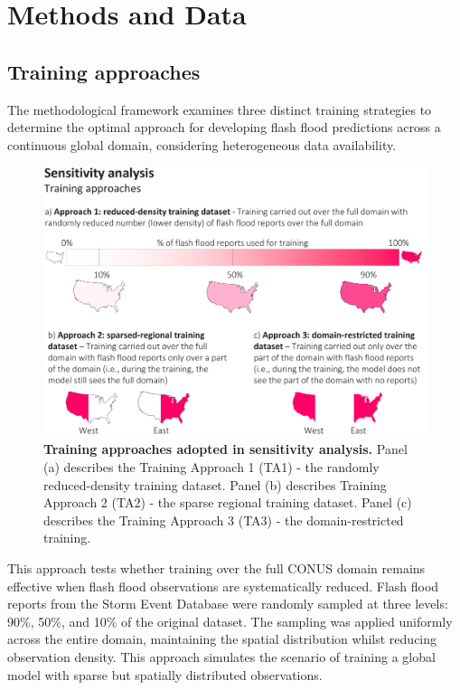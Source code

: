 

\section{Methods and Data}

\subsection{Training approaches}
The methodological framework examines three distinct training strategies to determine the optimal approach for developing flash flood predictions across a continuous global domain, considering heterogeneous data availability. 

\begin{figure}[htbp]
\centering
\includegraphics[width=\textwidth]{training_approaches.png}
\caption{\textbf{Training approaches adopted in sensitivity analysis.} Panel (a) describes the Training Approach 1 (TA1) - the randomly reduced-density training dataset. Panel (b) describes Training Approach 2 (TA2) - the sparse regional training dataset. Panel (c) describes the Training Approach 3 (TA3) - the domain-restricted training.}
\label{fig:training_approaches}
\end{figure}

This  approach tests whether training over the full CONUS domain remains effective when flash flood observations are systematically reduced. Flash flood reports from the Storm Event Database were randomly sampled at three levels: 90\%, 50\%, and 10\% of the original dataset. The sampling was applied uniformly across the entire domain, maintaining the spatial distribution whilst reducing observation density. This approach simulates the scenario of training a global model with sparse but spatially distributed observations.

